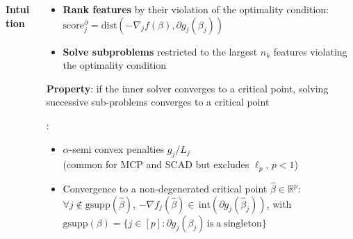 \documentclass[english,final,t]{beamer}
\newcommand{\bbR}{\mathbb{R}}
\begin{document}
\begin{frame}{}
\begin{columns}[t]
\begin{column}{.3\linewidth}
\begin{block}{\textbf{\color{malgared} Intuition}}
	\end{block}
\end{column}
\begin{column}{.3\linewidth}
	\begin{block}{\textbf{\color{malgared}{\# 1 Features Priorization}}}
		\begin{itemize}
			\item
			\textbf{Rank features} by their violation of the optimality condition:
			  $\mathrm{score}^\partial_j = \mathrm{dist}(-\nabla_j f (\beta), \partial g_j (\beta_j))$
			\item \textbf{Solve subproblems} restricted to the largest $n_k$ features violating the optimality condition
		\end{itemize}
		\textbf{\color{malgared}Property}: if the inner solver converges to a critical point, solving successive sub-problems converges to a critical point
		\end{block}
	\begin{block}{\textbf{\color{malgared}{\# 2 Support Identification}}}
		{\color{malgared}{Assumptions}}:
		\begin{itemize}
			\item
			$\alpha$-semi convex penalties $g_j / L_j$
			\\
			(common for MCP and SCAD but excludes $\ell_p$, $p<1$)
			\item
			Convergence to a non-degenerated critical point $\hat \beta \in \bbR^p$:\\
			 $\forall j \notin \mathrm{gsupp}(\hat \beta)$,
			$- \nabla f_j (\hat \beta) \in \, \mathrm{int}(\partial g_j(\hat \beta_j))$, with
			$\mathrm{gsupp}(\beta) = \{j \in [p]: \partial g_j(\beta_j) \, \mathrm{is \; a \; singleton}\}$
		\end{itemize}


\end{block}
\end{column}
\end{columns}
\end{frame}
\end{document}
